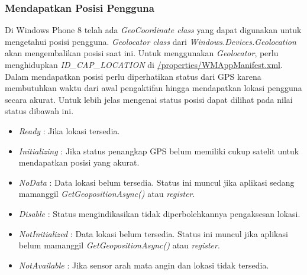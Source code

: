 \subsubsection{Mendapatkan Posisi Pengguna}
\label{subsubsec:Mendapatkan Posisi Pengguna}
\hspace{0.5cm} Di Windows Phone 8 telah ada \textit{GeoCoordinate class} yang dapat digunakan untuk mengetahui posisi pengguna. \textit{Geolocator class} dari \textit{Windows.Devices.Geolocation} akan mengembalikan posisi saat ini. Untuk menggunakan \textit{Geolocator}, perlu menghidupkan \textit{ID\_CAP\_LOCATION} di \url{/properties/WMAppManifest.xml}. Dalam mendapatkan posisi perlu diperhatikan status dari GPS karena membutuhkan waktu dari awal pengaktifan hingga mendapatkan lokasi pengguna secara akurat. Untuk lebih jelas mengenai status posisi dapat dilihat pada nilai status dibawah ini.

\begin{itemize}
	\item \textit{Ready} : Jika lokasi tersedia.
	\item \textit{Initializing} : Jika status penangkap GPS belum memiliki cukup satelit untuk mendapatkan posisi yang akurat. 
	\item \textit{NoData} : Data lokasi belum tersedia. Status ini muncul jika aplikasi sedang mamanggil \textit{GetGeopositionAsync()} atau \textit{register}.
	\item \textit{Disable} : Status mengindikasikan tidak diperbolehkannya pengaksesan lokasi.
	\item \textit{NotInitialized} : Data lokasi belum tersedia. Status ini muncul jika aplikasi belum mamanggil \textit{GetGeopositionAsync()} atau \textit{register}.
	\item \textit{NotAvailable} : Jika sensor arah mata angin dan lokasi tidak tersedia.
\end{itemize}

